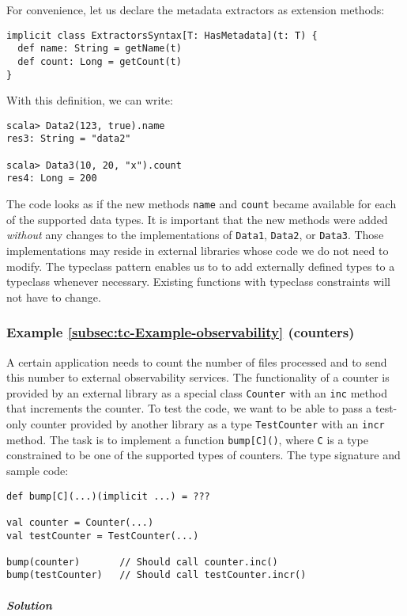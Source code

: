 For convenience, let us declare the metadata extractors as extension
methods:
\begin{lstlisting}
implicit class ExtractorsSyntax[T: HasMetadata](t: T) {
  def name: String = getName(t)
  def count: Long = getCount(t)
}
\end{lstlisting}
With this definition, we can write:
\begin{lstlisting}
scala> Data2(123, true).name
res3: String = "data2"

scala> Data3(10, 20, "x").count
res4: Long = 200
\end{lstlisting}
The code looks as if the new methods \lstinline!name! and \lstinline!count!
became available for each of the supported data types. It is important
that the new methods were added \emph{without} any changes to the
implementations of \lstinline!Data1!, \lstinline!Data2!, or \lstinline!Data3!.
Those implementations may reside in external libraries whose code
we do not need to modify. The typeclass pattern enables us to to add
externally defined types to a typeclass whenever necessary. Existing
functions with typeclass constraints will not have to change.

\subsubsection{Example \label{subsec:tc-Example-observability}\ref{subsec:tc-Example-observability}
(counters)}

A certain application needs to count the number of files processed
and to send this number to external observability services. The functionality
of a counter is provided by an external library as a special class
\lstinline!Counter! with an \lstinline!inc! method that increments
the counter. To test the code, we want to be able to pass a test-only
counter provided by another library as a type \lstinline!TestCounter!
with an \lstinline!incr! method. The task is to implement a function
\lstinline!bump[C]()!, where \lstinline!C! is a type constrained
to be one of the supported types of counters. The type signature and
sample code:
\begin{lstlisting}
def bump[C](...)(implicit ...) = ???

val counter = Counter(...)
val testCounter = TestCounter(...)

bump(counter)       // Should call counter.inc()
bump(testCounter)   // Should call testCounter.incr()
\end{lstlisting}


\subparagraph{Solution}

